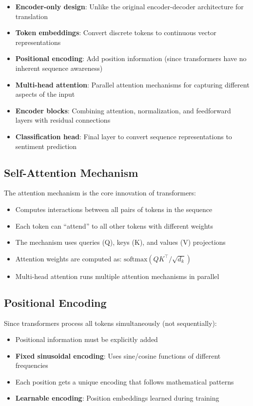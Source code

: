 \begin{itemize}
    \item \textbf{Encoder-only design}: Unlike the original encoder-decoder architecture for translation
    \item \textbf{Token embeddings}: Convert discrete tokens to continuous vector representations
    \item \textbf{Positional encoding}: Add position information (since transformers have no inherent sequence awareness)
    \item \textbf{Multi-head attention}: Parallel attention mechanisms for capturing different aspects of the input
    \item \textbf{Encoder blocks}: Combining attention, normalization, and feedforward layers with residual connections
    \item \textbf{Classification head}: Final layer to convert sequence representations to sentiment prediction
\end{itemize}

\subsection*{Self-Attention Mechanism}
The attention mechanism is the core innovation of transformers:

\begin{itemize}
    \item Computes interactions between all pairs of tokens in the sequence
    \item Each token can ``attend'' to all other tokens with different weights
    \item The mechanism uses queries (Q), keys (K), and values (V) projections
    \item Attention weights are computed as: $\text{softmax}(QK^\top / \sqrt{d_k})$
    \item Multi-head attention runs multiple attention mechanisms in parallel
\end{itemize}

\subsection*{Positional Encoding}
Since transformers process all tokens simultaneously (not sequentially):

\begin{itemize}
    \item Positional information must be explicitly added
    \item \textbf{Fixed sinusoidal encoding}: Uses sine/cosine functions of different frequencies
    \item Each position gets a unique encoding that follows mathematical patterns
    \item \textbf{Learnable encoding}: Position embeddings learned during training
\end{itemize}

